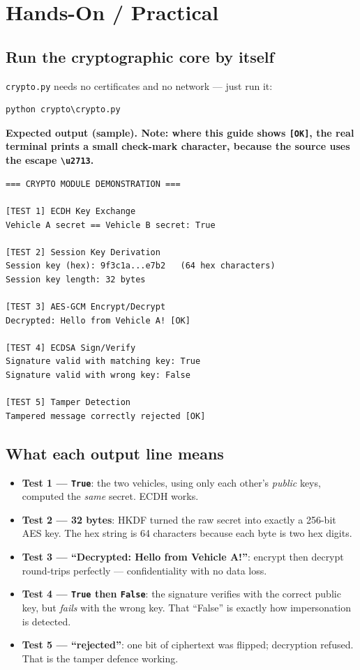 \documentclass[11pt,a4paper]{report}
\begin{document}
\section{Hands-On / Practical}

\subsection{Run the cryptographic core by itself}
\texttt{crypto.py} needs no certificates and no network --- just run it:
\begin{lstlisting}[style=term]
python crypto\crypto.py
\end{lstlisting}

\noindent\textbf{Expected output (sample). Note: where this guide shows
\texttt{[OK]}, the real terminal prints a small check-mark character, because the
source uses the escape \texttt{\textbackslash u2713}.}
\begin{lstlisting}[style=term]
=== CRYPTO MODULE DEMONSTRATION ===

[TEST 1] ECDH Key Exchange
Vehicle A secret == Vehicle B secret: True

[TEST 2] Session Key Derivation
Session key (hex): 9f3c1a...e7b2   (64 hex characters)
Session key length: 32 bytes

[TEST 3] AES-GCM Encrypt/Decrypt
Decrypted: Hello from Vehicle A! [OK]

[TEST 4] ECDSA Sign/Verify
Signature valid with matching key: True
Signature valid with wrong key: False

[TEST 5] Tamper Detection
Tampered message correctly rejected [OK]
\end{lstlisting}

\subsection{What each output line means}
\begin{itemize}
  \item \textbf{Test 1 --- \texttt{True}}: the two vehicles, using only each
        other's \emph{public} keys, computed the \emph{same} secret. ECDH works.
  \item \textbf{Test 2 --- 32 bytes}: HKDF turned the raw secret into exactly a
        256-bit AES key. The hex string is 64 characters because each byte is two
        hex digits.
  \item \textbf{Test 3 --- ``Decrypted: Hello from Vehicle A!''}: encrypt then
        decrypt round-trips perfectly --- confidentiality with no data loss.
  \item \textbf{Test 4 --- \texttt{True} then \texttt{False}}: the signature
        verifies with the correct public key, but \emph{fails} with the wrong
        key. That ``False'' is exactly how impersonation is detected.
  \item \textbf{Test 5 --- ``rejected''}: one bit of ciphertext was flipped;
        decryption refused. That is the tamper defence working.
\end{itemize}
\end{document}
